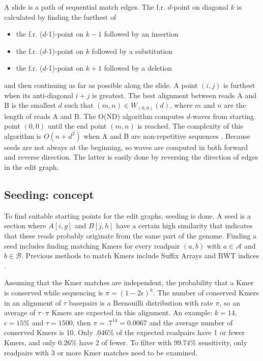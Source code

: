 \documentclass[../main/thesis.tex]{subfiles}
\begin{document}
A slide is a path of sequential match edges.
The f.r. $d$-point on diagonal $k$ is calculated by finding the furthest of
\begin{itemize}
\item the f.r. ($d$-1)-point on $k-1$ followed by an insertion
\item the f.r. ($d$-1)-point on $k$ followed by a substitution
\item the f.r. ($d$-1)-point on $k+1$ followed by a deletion
\end{itemize}
and then continuing as far as possible along the slide.
A point $(i,j)$ is furthest when its anti-diagonal $i+j$ is greatest.
The best alignment between reads A and B is the smallest $d$ such that $(m,n)\in W_{(0,0)}(d)$, where $m$ and $n$ are the length of reads A and B.
The O(ND) algorithm computes $d$-waves from starting point $(0,0)$ until the end point $(m,n)$ is reached.
The complexity of this algorithm is $O(n+d^2)$ when A and B are non-repetitive sequences \cite{Daligner}.
Because seeds are not always at the beginning, so waves are computed in both forward and reverse direction.
The latter is easily done by reversing the direction of edges in the edit graph.

\subsection{Seeding: concept}
To find suitable starting points for the edit graphs, seeding is done.
A seed is a section where $A[i,g]$ and $B[j,h]$ have a certain high similarity that indicates that these reads probably originate from the same part of the genome.
Finding a seed includes finding matching Kmers for every readpair $(a,b)$ with $a\in \mathcal{A}$ and $b\in \mathcal{B}$.
Previous methods to match Kmers include Suffix Arrays \cite{SA} and BWT indices \cite{BWT}.

Assuming that the Kmer matches are independent, the probability that a Kmer is conserved while sequencing is $\pi = (1-2\epsilon)^k$.
The number of conserved Kmers in an alignment of $\tau$ basepairs is a Bernouilli distribution with rate $\pi$, so an average of $\tau\cdot\pi$ Kmers are expected in this alignment.
An example: $k=14$, $\epsilon=15\%$ and $\tau = 1500$, then $\pi = .7^{14} = 0.0067$ and the average number of conserved Kmers is 10.
Only $.046\%$ of the expected readpairs have 1 or fewer Kmers, and only $0.26\%$ have 2 of fewer.
To filter with $99.74\%$ sensitivity, only readpairs with 3 or more Kmer matches need to be examined.
\end{document}
